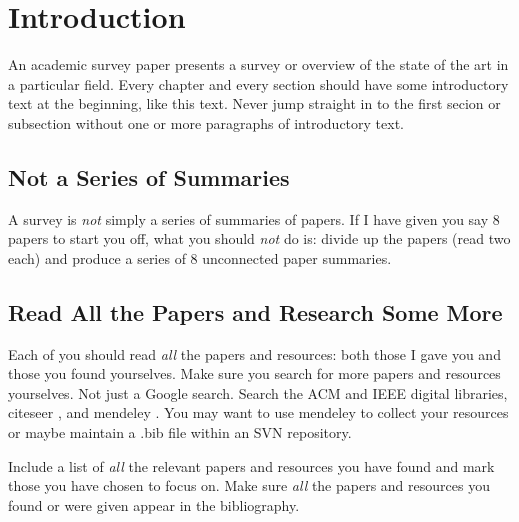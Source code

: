 %
%
% 
% 
% 


\chapter{Introduction}

\label{chap:Intro}



An academic survey paper presents a survey or overview of the state of
the art in a particular field. Every chapter and every section should
have some introductory text at the beginning, like this text. Never
jump straight in to the first secion or subsection without one or more
paragraphs of introductory text.






\section{Not a Series of Summaries}

A survey is \emph{not} simply a series of summaries of papers.
If I have given you say 8 papers to start you off, what you should
\emph{not} do is: divide up the papers (read two each) and produce a
series of 8 unconnected paper summaries.




\section{Read All the Papers and Research Some More}

Each of you should read \emph{all} the papers and resources: both
those I gave you and those you found yourselves.
%
Make sure you search for more papers and resources yourselves. Not
just a Google search. Search the ACM \citep{ACM-DL} and IEEE
\citep{IEEE-DL} digital libraries, citeseer \citep{CiteSeer}, and
mendeley \citep{Mendeley}. You may want to use mendeley to collect
your resources or maybe maintain a .bib file within an SVN repository.

Include a list of \emph{all} the relevant papers and resources you
have found and mark those you have chosen to focus on. Make sure
\emph{all} the papers and resources you found or were given appear in
the bibliography.




